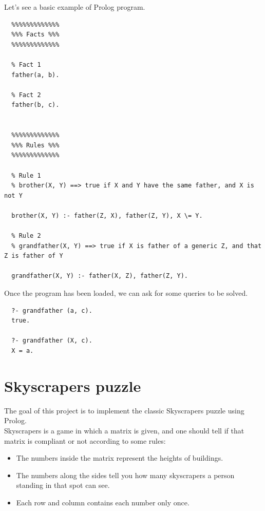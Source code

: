 \documentclass{article}
\begin{document}
\pagebreak

Let's see a basic example of Prolog program.\\

\begin{lstlisting}
  %%%%%%%%%%%%%
  %%% Facts %%%
  %%%%%%%%%%%%%

  % Fact 1
  father(a, b).

  % Fact 2
  father(b, c).
  

  %%%%%%%%%%%%%
  %%% Rules %%%
  %%%%%%%%%%%%%

  % Rule 1
  % brother(X, Y) ==> true if X and Y have the same father, and X is not Y

  brother(X, Y) :- father(Z, X), father(Z, Y), X \= Y. 

  % Rule 2
  % grandfather(X, Y) ==> true if X is father of a generic Z, and that Z is father of Y

  grandfather(X, Y) :- father(X, Z), father(Z, Y).

\end{lstlisting}

Once the program has been loaded, we can ask for some queries to be solved.\\

\begin{lstlisting}
  ?- grandfather (a, c).
  true.
  
  ?- grandfather (X, c).
  X = a.

\end{lstlisting}

\pagebreak

\section{Skyscrapers puzzle}
The goal of this project is to implement the classic Skyscrapers puzzle using Prolog.\\

Skyscrapers is a game in which a matrix is given, and one should tell if that matrix is compliant or not according to some rules:\\

\begin{itemize}
  \item The numbers inside the matrix represent the heights of buildings.
  \item The numbers along the sides tell you how many skyscrapers a person standing in that spot can see.
  \item Each row and column contains each number only once.
\end{itemize}
\end{document}
